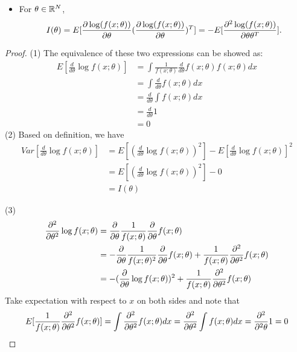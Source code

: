 \begin{refsection}
\begin{theorem}
\begin{itemize}
		\item For $\theta \in \mathbb{R}^N$, 
		$$I(\theta) = E[\frac{\partial \log(f(x;\theta))}{\partial \theta}(\frac{\partial \log(f(x;\theta))}{\partial \theta})^T] = -E[\frac{\partial^2 \log(f(x;\theta))}{\partial \theta\theta^T}].$$   
	\end{itemize}	
\end{theorem}
\begin{proof}
	(1)	
	The equivalence of these two expressions can be showed as:
	\begin{align*}
	E[\frac{d}{d\theta} \log f(x;\theta)] &= \int \frac{1}{f(x;\theta)} \frac{d}{d\theta} f(x;\theta) f(x;\theta) dx \\
	&= \int  \frac{d}{d\theta} f(x;\theta)  dx \\
	&= \frac{d}{d\theta} \int f(x;\theta)  dx \\
	& = \frac{d}{d\theta} 1 \\
	&= 0
	\end{align*}
	(2) Based on definition, we have
	\begin{align*}
	Var[\frac{d}{d\theta}\log f(x;\theta)] &= E[(\frac{d}{d\theta}\log f(x;\theta))^2] - E[\frac{d}{d\theta}\log f(x;\theta)]^2 \\
	&= E[(\frac{d}{d\theta}\log f(x;\theta))^2] - 0 \\
	&= I(\theta)
	\end{align*}
	
(3)
\begin{align*}
\frac{\partial^2}{\partial \theta^2} \log f(x;\theta) &= \frac{\partial}{\partial \theta}\frac{1}{f(x;\theta)}\frac{\partial}{\partial \theta} f(x;\theta) \\
&= -\frac{\partial}{\partial \theta}\frac{1}{f(x;\theta)^2}\frac{\partial}{\partial \theta} f(x;\theta) + \frac{1}{f(x;\theta)}\frac{\partial^2}{\partial \theta^2} f(x;\theta)  \\
&= -(\frac{\partial}{\partial \theta} \log f(x;\theta))^2 + \frac{1}{f(x;\theta)}\frac{\partial^2}{\partial \theta^2} f(x;\theta)  
\end{align*}	
Take expectation with respect to $x$ on both sides and note that
$$E[\frac{1}{f(x;\theta)}\frac{\partial^2}{\partial \theta^2} f(x;\theta)]=\int \frac{\partial^2}{\partial \theta^2} f(x;\theta) dx = \frac{\partial^2}{\partial \theta^2} \int  f(x;\theta) dx =   \frac{\partial^2}{\partial^2 \theta} 1 = 0
$$
	

	
	
	
	
\end{proof}



\end{refsection}
